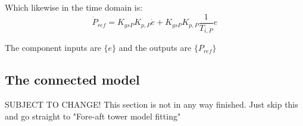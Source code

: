 Which likewise in the time domain is:
\begin{equation}\label{eq:comp_plc_time}
	\dot{P}_{ref} = K_{gs P} K_{p, P} \dot{e} +  K_{gs P} K_{p, P} \dfrac{1}{T_{i, P}}e
\end{equation}

The component inputs are $ \{e \} $ and the outputs are $ \{P_{ref} \} $

%


%	


\subsection{The connected model}
SUBJECT TO CHANGE! This section is not in any way finished. Just skip this and go straight to "Fore-aft tower model fitting"

